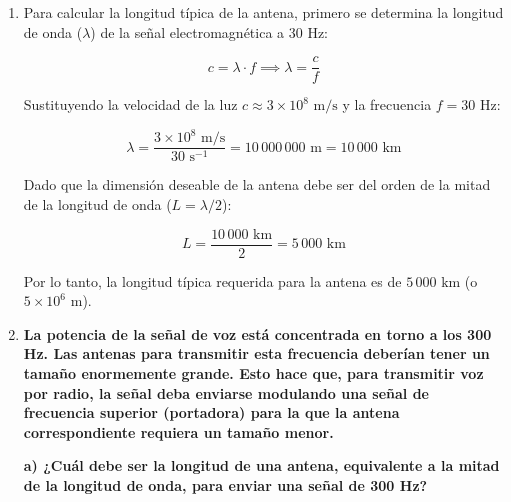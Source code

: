 \documentclass[11pt,a4paper]{article}
\begin{document}
\begin{enumerate}[label=4.\arabic*), itemsep=0.3cm]
        \section*{Conclusión}
        Queda demostrado que tanto al duplicar la frecuencia de transmisión ($f$) como al duplicar la distancia de enlace ($d$), el término dependiente introduce un factor $20 \log_{10}(2) \approx 6\text{ dB}$ adicional a la pérdida de propagación en espacio libre, atenuando la potencia de la señal recibida en $6\text{ dB}$ en ambos casos. \quad $\blacksquare$
  \item
        Para calcular la longitud típica de la antena, primero se determina la longitud de onda ($\lambda$) de la señal electromagnética a $30\text{ Hz}$:

        \begin{equation}
          c = \lambda \cdot f \implies \lambda = \frac{c}{f}
        \end{equation}

        Sustituyendo la velocidad de la luz $c \approx 3 \times 10^8\text{ m/s}$ y la frecuencia $f = 30\text{ Hz}$:

        \begin{equation}
          \lambda = \frac{3 \times 10^8\text{ m/s}}{30\text{ s}^{-1}} = 10\,000\,000\text{ m} = 10\,000\text{ km}
        \end{equation}

        Dado que la dimensión deseable de la antena debe ser del orden de la mitad de la longitud de onda ($L = \lambda / 2$):

        \begin{equation}
          L = \frac{10\,000\text{ km}}{2} = 5\,000\text{ km}
        \end{equation}

        Por lo tanto, la longitud típica requerida para la antena es de \textbf{$5\,000\text{ km}$} (o $5 \times 10^6\text{ m}$).
 \item \textbf{La potencia de la señal de voz está concentrada en torno a los 300 Hz. Las antenas para transmitir esta frecuencia deberían tener un tamaño enormemente grande. Esto hace que, para transmitir voz por radio, la señal deba enviarse modulando una señal de frecuencia superior (portadora) para la que la antena correspondiente requiera un tamaño menor.}

\textbf{a) ¿Cuál debe ser la longitud de una antena, equivalente a la mitad de la longitud de onda, para enviar una señal de 300 Hz?}


\end{enumerate}
\end{document}
